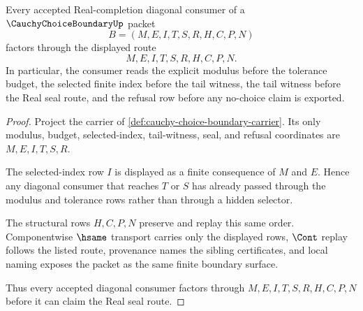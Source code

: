 \begin{theorem}
\label{thm:cauchy-choice-boundary-diagonal-budget-factorization}
Every accepted Real-completion diagonal consumer of a $\CauchyChoiceBoundaryUp$ packet
$$
B=(M,E,I,T,S,R,H,C,P,N)
$$
factors through the displayed route
$$
M,E,I,T,S,R,H,C,P,N.
$$
In particular, the consumer reads the explicit modulus before the tolerance budget, the selected finite index before the tail witness, the tail witness before the Real seal route, and the refusal row before any no-choice claim is exported.
\end{theorem}
\begin{proof}
Project the carrier of \autoref{def:cauchy-choice-boundary-carrier}. Its only modulus, budget, selected-index, tail-witness, seal, and refusal coordinates are $M,E,I,T,S,R$.

The selected-index row $I$ is displayed as a finite consequence of $M$ and $E$. Hence any diagonal consumer that reaches $T$ or $S$ has already passed through the modulus and tolerance rows rather than through a hidden selector.

The structural rows $H,C,P,N$ preserve and replay this same order. Componentwise $\hsame$ transport carries only the displayed rows, $\Cont$ replay follows the listed route, provenance names the sibling certificates, and local naming exposes the packet as the same finite boundary surface.

Thus every accepted diagonal consumer factors through $M,E,I,T,S,R,H,C,P,N$ before it can claim the Real seal route.
\end{proof}

